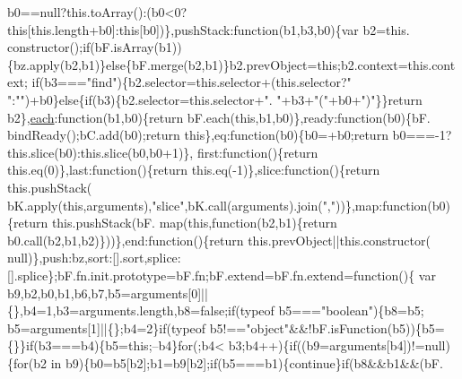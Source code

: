 \begin{DoxyCode}
      b0==null?this.toArray():(b0<0?\textcolor{keyword}{this}[this.length+b0]:\textcolor{keyword}{this}[b0])\},pushStack:\textcolor{keyword}{function}(b1,b3,b0)\{var b2=this.
      constructor();\textcolor{keywordflow}{if}(bF.isArray(b1))\{bz.apply(b2,b1)\}\textcolor{keywordflow}{else}\{bF.merge(b2,b1)\}b2.prevObject=\textcolor{keyword}{this};b2.context=this.context;\textcolor{keywordflow}{
      if}(b3===\textcolor{stringliteral}{"find"})\{b2.selector=this.selector+(this.selector?\textcolor{stringliteral}{" "}:\textcolor{stringliteral}{""})+b0\}\textcolor{keywordflow}{else}\{\textcolor{keywordflow}{if}(b3)\{b2.selector=this.selector+\textcolor{stringliteral}{".
      "}+b3+\textcolor{stringliteral}{"("}+b0+\textcolor{stringliteral}{")"}\}\}\textcolor{keywordflow}{return} b2\},\hyperlink{jquery_8js_a871ff39db627c54c710a3e9909b8234c}{each}:\textcolor{keyword}{function}(b1,b0)\{\textcolor{keywordflow}{return} bF.each(\textcolor{keyword}{this},b1,b0)\},ready:\textcolor{keyword}{function}(b0)\{bF.
      bindReady();bC.add(b0);\textcolor{keywordflow}{return} \textcolor{keyword}{this}\},eq:\textcolor{keyword}{function}(b0)\{b0=+b0;\textcolor{keywordflow}{return} b0===-1?this.slice(b0):this.slice(b0,b0+1)\},
      first:\textcolor{keyword}{function}()\{\textcolor{keywordflow}{return} this.eq(0)\},last:\textcolor{keyword}{function}()\{\textcolor{keywordflow}{return} this.eq(-1)\},slice:\textcolor{keyword}{function}()\{\textcolor{keywordflow}{return} this.pushStack(
      bK.apply(\textcolor{keyword}{this},arguments),\textcolor{stringliteral}{"slice"},bK.call(arguments).join(\textcolor{stringliteral}{","}))\},map:\textcolor{keyword}{function}(b0)\{\textcolor{keywordflow}{return} this.pushStack(bF.
      map(\textcolor{keyword}{this},\textcolor{keyword}{function}(b2,b1)\{return b0.call(b2,b1,b2)\}))\},end:\textcolor{keyword}{function}()\{\textcolor{keywordflow}{return} this.prevObject||this.constructor(
      null)\},push:bz,sort:[].sort,splice:[].splice\};bF.fn.init.prototype=bF.fn;bF.extend=bF.fn.extend=\textcolor{keyword}{function}()\{
      var b9,b2,b0,b1,b6,b7,b5=arguments[0]||\{\},b4=1,b3=arguments.length,b8=\textcolor{keyword}{false};\textcolor{keywordflow}{if}(typeof b5===\textcolor{stringliteral}{"boolean"})\{b8=b5;
      b5=arguments[1]||\{\};b4=2\}\textcolor{keywordflow}{if}(typeof b5!==\textcolor{stringliteral}{"object"}&&!bF.isFunction(b5))\{b5=\{\}\}\textcolor{keywordflow}{if}(b3===b4)\{b5=\textcolor{keyword}{this};--b4\}\textcolor{keywordflow}{for}(;b4<
      b3;b4++)\{\textcolor{keywordflow}{if}((b9=arguments[b4])!=null)\{\textcolor{keywordflow}{for}(b2 in b9)\{b0=b5[b2];b1=b9[b2];\textcolor{keywordflow}{if}(b5===b1)\{\textcolor{keywordflow}{continue}\}\textcolor{keywordflow}{if}(b8&&b1&&(bF.

\end{DoxyCode}
